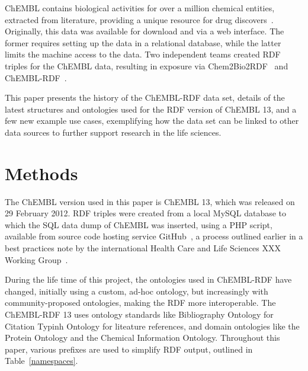 \documentclass[sw]{iosart2c}
\begin{document}
ChEMBL contains biological activities for over a million chemical entities, extracted from
literature, providing a unique resource for drug discovers~\cite{Gaulton2012,Warr2009}. Originally, this
data was available for download and via a web interface. The former requires setting up
the data in a relational database, while the latter limits the machine access to the data.
Two independent teams created RDF triples for the ChEMBL data, resulting in exposure
via Chem2Bio2RDF~\cite{Chen2010} and ChEMBL-RDF~\cite{Willighagen2011}.

This paper presents the history of the ChEMBL-RDF data set, details of the latest structures
and ontologies used for the RDF version of ChEMBL 13, and a few new example use cases,
exemplifying how the data set can be linked to other data sources to further support
research in the life sciences.

\section{Methods}\label{s2}

The ChEMBL version used in this paper is ChEMBL 13, which was released on 29 February 2012.
RDF triples were created from a local MySQL database to which the SQL data dump of ChEMBL was
inserted, using a PHP script, available from source code hosting service
GitHub~\citep{ChEMBLRDFGitHub}, a process outlined earlier in a best practices note by
the international Health Care and Life Sciences XXX Working Group~\cite{Marshall2012}.

During the life time of this project, the ontologies used in ChEMBL-RDF have changed,
initially using a custom, ad-hoc ontology, but increasingly with community-proposed
ontologies, making the RDF more interoperable. The ChEMBL-RDF 13 uses ontology
standards like Bibliography Ontology for Citation Typinh Ontology for liteature
references, and domain ontologies like the Protein Ontology and the Chemical Information
Ontology. Throughout this paper, various prefixes are used to simplify RDF output, outlined
in Table~\ref{namespaces}.
\end{document}
